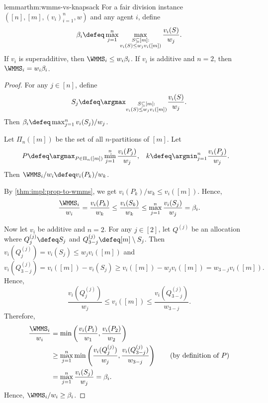 \begin{restatable}{lemma}{rthm:wmms-vs-knapsack}
\label{thm:wmms-vs-knapsack}
For a fair division instance $([n], [m], (v_i)_{i=1}^n, w)$ and any agent $i$, define
\[ \beta_i \defeq \max_{j=1}^n \max_{\substack{S \subseteq [m]:\\v_i(S) \le w_jv_i([m])}} \frac{v_i(S)}{w_j}. \]
If $v_i$ is superadditive, then $\WMMS_i \le w_i\beta_i$.
If $v_i$ is additive and $n = 2$, then $\WMMS_i = w_i\beta_i$.
\end{restatable}
\begin{proof}
For any $j \in [n]$, define
\[ S_j \defeq \argmax_{\substack{S \subseteq [m]:\\v_i(S) \le w_jv_i([m])}} \frac{v_i(S)}{w_j}. \]
Then $\beta_i \defeq \max_{j=1}^n v_i(S_j)/w_j$.

Let $\Pi_n([m])$ be the set of all $n$-partitions of $[m]$. Let
\begin{align*}
P &\defeq \argmax_{P \in \Pi_n([m])} \min_{j=1}^n \frac{v_i(P_j)}{w_j},
& k &\defeq \argmin_{j=1}^n \frac{v_i(P_j)}{w_j}.
\end{align*}
Then $\WMMS_i/w_i \defeq v_i(P_k)/w_k$.

By \cref{thm:impl:prop-to-wmms}, we get $v_i(P_k)/w_k \le v_i([m])$. Hence,
\[ \frac{\WMMS_i}{w_i} = \frac{v_i(P_k)}{w_k} \le \frac{v_i(S_k)}{w_k}
    \le \max_{j=1}^n \frac{v_i(S_j)}{w_j} = \beta_i. \]

Now let $v_i$ be additive and $n = 2$.
For any $j \in [2]$, let $Q^{(j)}$ be an allocation where $Q^{(j)}_j \defeq S_j$
and $Q^{(j)}_{3-j} \defeq [m] \setminus S_j$.
Then $v_i(Q^{(j)}_j) = v_i(S_j) \le w_jv_i([m])$ and
\[ v_i(Q^{(j)}_{3-j}) = v_i([m]) - v_i(S_j) \ge v_i([m]) - w_jv_i([m]) = w_{3-j}v_i([m]). \]
Hence,
\[ \frac{v_i(Q^{(j)}_j)}{w_j} \le v_i([m]) \le \frac{v_i(Q^{(j)}_{3-j})}{w_{3-j}}. \]
Therefore,
\begin{align*}
\frac{\WMMS_i}{w_i} &= \min\left(\frac{v_i(P_1)}{w_1}, \frac{v_i(P_2)}{w_2}\right)
\\ &\ge \max_{j=1}^n \min\left(\frac{v_i(Q^{(j)}_j)}{w_j}, \frac{v_i(Q^{(j)}_{3-j})}{w_{3-j}}\right)
    \tag{by definition of $P$}
\\ &= \max_{j=1}^n \frac{v_i(S_j)}{w_j} = \beta_i.
\end{align*}
Hence, $\WMMS_i/w_i \ge \beta_i$.
\end{proof}

